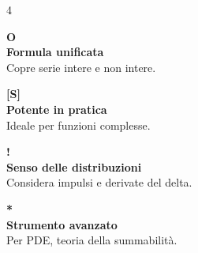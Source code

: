 \documentclass[a3paper, 12pt]{article}
\begin{document}
\begin{tcolorbox}[enhanced, colback=bgMid, colframe=accentGold,
                  coltext=textLight, arc=4pt, boxrule=1pt,
                  title={\color{accentGold}\bfseries\large KEY POINTS}]

\begin{multicols}{4}
\begin{center}
  \textcolor{accentGold}{\huge\textbf{O}}\\[4pt]
  \textbf{\color{accentGold}Formula unificata}\\[2pt]
  \small Copre serie intere e non intere.
\end{center}

\columnbreak
\begin{center}
  \textcolor{accentBlue}{\huge\textbf{[S]}}\\[4pt]
  \textbf{\color{accentBlue}Potente in pratica}\\[2pt]
  \small Ideale per funzioni complesse.
\end{center}

\columnbreak
\begin{center}
  \textcolor{accentGreen}{\huge\textbf{!}}\\[4pt]
  \textbf{\color{accentGreen}Senso delle distribuzioni}\\[2pt]
  \small Considera impulsi e derivate del delta.
\end{center}

\columnbreak
\begin{center}
  \textcolor{boxOrange}{\huge\textbf{*}}\\[4pt]
  \textbf{\color{boxOrange}Strumento avanzato}\\[2pt]
  \small Per PDE, teoria della summabilità.
\end{center}

\end{multicols}
\end{tcolorbox}
\end{document}
